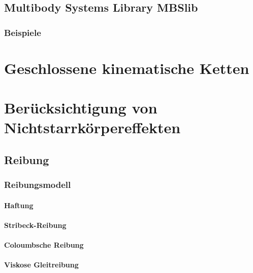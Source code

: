 \documentclass[a4paper, 11pt, accentcolor = tud3b]{tudreport}
\begin{document}
			\subsection{Multibody Systems Library MBSlib} %

				\subsubsection{Beispiele} %

		\section{Geschlossene kinematische Ketten} %

		\section{Berücksichtigung von Nichtstarrkörpereffekten} %

			\subsection{Reibung} %

				\subsubsection{Reibungsmodell} %

					\paragraph{Haftung} %

					\paragraph{Stribeck-Reibung} %

					\paragraph{Coloumbsche Reibung} %

					\paragraph{Viskose Gleitreibung} %
\end{document}
